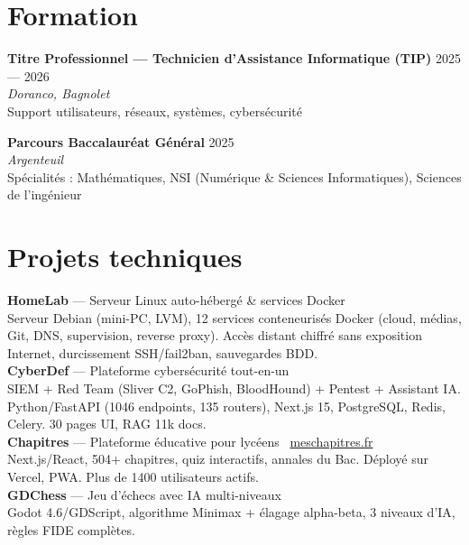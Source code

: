 \documentclass[a4paper,10pt]{article}
\newcommand{\cvitem}[4]{%
    \textbf{#1} \hfill \textcolor{muted}{\small #2}\\
    \textit{\small #3}\\
    {\small #4}\vspace{4pt}
}
\begin{document}
\section{Formation}

\cvitem{Titre Professionnel — Technicien d'Assistance Informatique (TIP)}{2025 — 2026}{Doranco, Bagnolet}{Support utilisateurs, réseaux, systèmes, cybersécurité}

\cvitem{Parcours Baccalauréat Général}{2025}{Argenteuil}{Spécialités : Mathématiques, NSI (Numérique \& Sciences Informatiques), Sciences de l'ingénieur}

\section{Projets techniques}

\textbf{HomeLab} — Serveur Linux auto-hébergé \& services Docker\\
{\small Serveur Debian (mini-PC, LVM), 12 services conteneurisés Docker (cloud, médias, Git, DNS, supervision, reverse proxy). Accès distant chiffré sans exposition Internet, durcissement SSH/fail2ban, sauvegardes BDD.}\\[4pt]

\textbf{CyberDef} — Plateforme cybersécurité tout-en-un\\
{\small SIEM + Red Team (Sliver C2, GoPhish, BloodHound) + Pentest + Assistant IA. Python/FastAPI (1046 endpoints, 135 routers), Next.js 15, PostgreSQL, Redis, Celery. 30 pages UI, RAG 11k docs.}\\[4pt]

\textbf{Chapitres} — Plateforme éducative pour lycéens \faExternalLink* \ \href{https://meschapitres.fr}{meschapitres.fr}\\
{\small Next.js/React, 504+ chapitres, quiz interactifs, annales du Bac. Déployé sur Vercel, PWA. Plus de 1400 utilisateurs actifs.}\\[4pt]

\textbf{GDChess} — Jeu d'échecs avec IA multi-niveaux\\
{\small Godot 4.6/GDScript, algorithme Minimax + élagage alpha-beta, 3 niveaux d'IA, règles FIDE complètes.}

\end{document}
